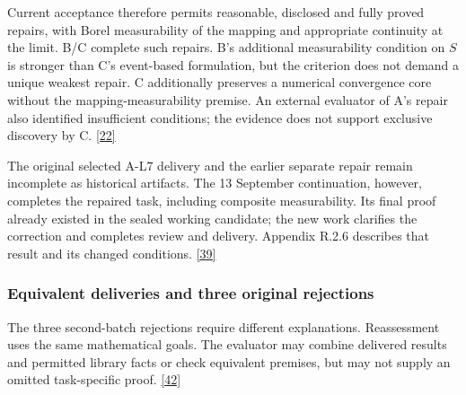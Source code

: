 Current acceptance therefore permits reasonable, disclosed and fully proved repairs, with Borel measurability of the mapping and appropriate continuity at the limit. B/C complete such repairs. B's additional measurability condition on $S$ is stronger than C's event-based formulation, but the criterion does not demand a unique weakest repair. C additionally preserves a numerical convergence core without the mapping-measurability premise. An external evaluator of A's repair also identified insufficient conditions; the evidence does not support exclusive discovery by C. \href{en.pdf\#ref-22}{\mbox{[22]}}

The original selected A-L7 delivery and the earlier separate repair remain incomplete as historical artifacts. The 13 September continuation, however, completes the repaired task, including composite measurability. Its final proof already existed in the sealed working candidate; the new work clarifies the correction and completes review and delivery. Appendix R.2.6 describes that result and its changed conditions. \href{en.pdf\#ref-39}{\mbox{[39]}}

\subsubsection[Equivalent deliveries and three original rejections]{\texorpdfstring{\protect\hypertarget{r1-5}{}Equivalent deliveries and three original rejections}{Equivalent deliveries and three original rejections}}
The three second-batch rejections require different explanations. Reassessment uses the same mathematical goals. The evaluator may combine delivered results and permitted library facts or check equivalent premises, but may not supply an omitted task-specific proof. \href{en.pdf\#ref-42}{\mbox{[42]}}

